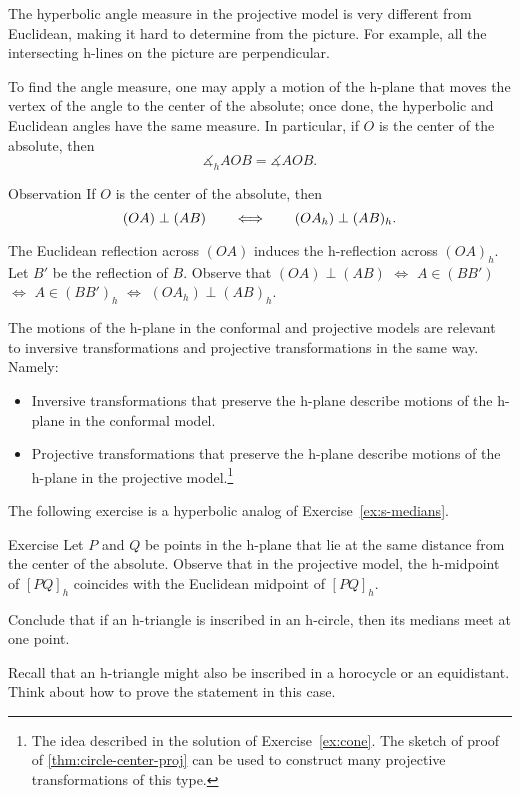 The hyperbolic angle measure in the projective model is very different from Euclidean, making it hard to determine from the picture. 
\label{klein-angles}
For example, all the intersecting h-lines on the picture 
are perpendicular.

To find the angle measure,
one may apply a motion of the h-plane that moves 
the vertex of the angle to the center of the absolute;
once done, the hyperbolic and Euclidean angles have the same measure.
In particular, if $O$ is the center of the absolute, then 
$$\measuredangle_hAOB=\measuredangle AOB.$$

\begin{thm}{Observation}\label{obs:h-p-perp}
If $O$ is the center of the absolute, then 
\[(OA)\perp (AB)\qquad\Longleftrightarrow\qquad(OA_h)\perp (AB)_h.\]

\end{thm}

The Euclidean reflection across $(OA)$ induces the h-reflection across $(OA)_h$.
Let $B'$ be the reflection of $B$.
Observe that $(OA)\perp (AB)$ $\Longleftrightarrow$ $A\in(BB')$ $\Longleftrightarrow$  $A\in(BB')_h$ $\Longleftrightarrow$  $(OA_h)\perp (AB)_h$.
\qeds

The motions of the h-plane in the conformal and projective models are relevant to inversive transformations and projective transformations in the same way.
Namely: 
\begin{itemize}
\item Inversive transformations that preserve the h-plane describe motions of the h-plane in the conformal model.
\item Projective transformations that preserve the h-plane describe motions of the h-plane in the projective model.\footnote{The idea described in the solution of Exercise~\ref{ex:cone}.
The sketch of proof of \ref{thm:circle-center-proj} can be used to construct many projective transformations of this type.}
\end{itemize}

The following exercise is a hyperbolic analog of Exercise~\ref{ex:s-medians}. 

\begin{thm}{Exercise}\label{ex:h-median}
Let $P$ and $Q$ be points in the h-plane that lie at the same distance from the center of the absolute.
Observe that in the projective model, the h-midpoint of $[PQ]_h$ coincides with the Euclidean midpoint of $[PQ]_h$.

Conclude that if an h-triangle is inscribed in an h-circle, then its medians meet at one point.

Recall that an h-triangle might also be inscribed in a horocycle or an equidistant.
Think about how to prove the statement in this case.
\end{thm}

